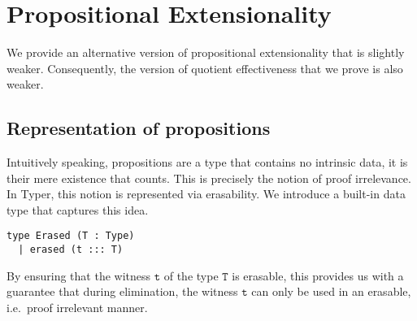 \documentclass[12pt,twoside,maitrise]{dms}
\theoremstyle{definition}
\numberwithin{equation}{section}
\numberwithin{table}{chapter}
\numberwithin{figure}{chapter}
\newcommand\id[1] {\texttt{#1}}
\begin{document}
\section{Propositional Extensionality}
We provide an alternative version of propositional extensionality that is
slightly weaker. Consequently, the version of quotient effectiveness that we
prove is also weaker.

\subsection*{Representation of propositions}\label{subsec:mere-propositions}

Intuitively speaking, propositions are a type that contains no intrinsic data, it
is their mere existence that counts. This is precisely the notion of proof
irrelevance. In Typer, this notion is represented via erasability. We introduce
a built-in data type that captures this idea.

\begin{verbatim}
type Erased (T : Type)
  | erased (t ::: T)
\end{verbatim}

By ensuring that the witness $\id{t}$ of the type $\id{T}$ is erasable, this
provides us with a guarantee that during elimination, the witness $\id{t}$ can
only be used in an erasable, i.e.\ proof irrelevant manner.





\end{document}
